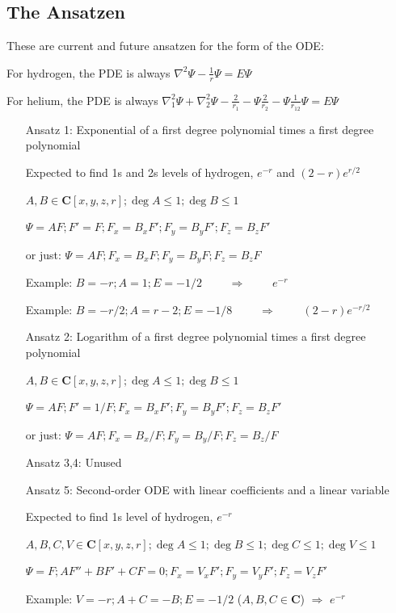 \documentclass{article}
\begin{document}
\subsection*{The Ansatzen}

These are current and future ansatzen for the form of the ODE:

For hydrogen, the PDE is always $\nabla^2 \Psi - \frac{1}{r} \Psi = E \Psi$

For helium, the PDE is always $\nabla_1^2 \Psi + \nabla_2^2 \Psi - \frac{2}{r_1} - \Psi \frac{2}{r_2} - \Psi \frac{1}{r_{12}} \Psi = E \Psi$

\begin{itemize}
\item[Ansatz 1:] Exponential of a first degree polynomial times a first degree polynomial

Expected to find 1s and 2s levels of hydrogen, $e^{-r}$ and $(2-r)e^{r/2}$

$A,B \in \mathbf{C}[x,y,z,r]; \deg A \le 1; \deg B \le 1$

$\Psi = A F; F' = F; F_x = B_x F'; F_y = B_y F'; F_z = B_z F'$

or just: $\Psi = A F; F_x = B_x F; F_y = B_y F; F_z = B_z F$

Example: $B=-r; A=1; E=-1/2$ $\qquad\Rightarrow\qquad$ $e^{-r}$

Example: $B=-r/2; A=r-2; E=-1/8$ $\qquad\Rightarrow\qquad$ $(2-r)e^{-r/2}$

\item[Ansatz 2:] Logarithm of a first degree polynomial times a first degree polynomial

$A,B \in \mathbf{C}[x,y,z,r]; \deg A \le 1; \deg B \le 1$

$\Psi = A F; F' = 1/F; F_x = B_x F'; F_y = B_y F'; F_z = B_z F'$

or just: $\Psi = A F; F_x = B_x / F; F_y = B_y / F; F_z = B_z / F$

\item[Ansatz 3,4:] Unused

\item[Ansatz 5:] Second-order ODE with linear coefficients and a linear variable

Expected to find 1s level of hydrogen, $e^{-r}$

$A,B,C,V \in \mathbf{C}[x,y,z,r]; \deg A \le 1; \deg B \le 1; \deg C \le 1; \deg V \le 1$

$\Psi = F; A F'' + B F' + C F = 0; F_x = V_x F'; F_y = V_y F'; F_z = V_z F'$

Example: $V=-r; A+C=-B; E=-1/2$ ($A, B, C \in \mathbf{C}$) $\Rightarrow$ $e^{-r}$


\end{itemize}
\end{document}
